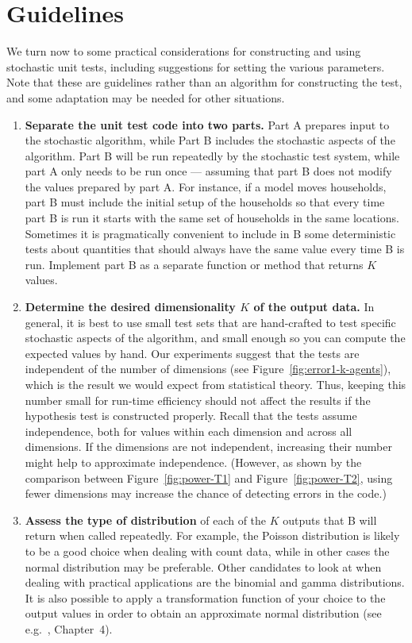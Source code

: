 \documentclass{sig-alternate-preprint}
\begin{document}
\section{Guidelines}
\label{sec:guidelines}

We turn now to some practical considerations for constructing and using
stochastic unit tests, including suggestions for setting the various
parameters.  Note that these are guidelines rather than an
algorithm for constructing the test, and some adaptation may be needed for
other situations.

\begin{enumerate}

\item
{\bf Separate the unit test code into two parts.}  Part A prepares input to the
stochastic algorithm, while Part B includes the stochastic aspects of the
algorithm.  Part B will be run repeatedly by the stochastic test system,
while part A only needs to be run once --- assuming that part B does not
modify the values prepared by part A\@.  For instance, if a model moves
households, part B must include the initial setup of the households so that
every time part B is run it starts with the same set of households in the
same locations.  Sometimes it is pragmatically convenient to include in B
some deterministic tests about quantities that should always have the same
value every time B is run.  Implement part B as a separate function or
method that returns $K$ values.

\item
{\bf Determine the desired dimensionality $K$ of the output data.}  In
general, it is best to use small test sets that are hand-crafted to test
specific stochastic aspects of the algorithm, and small enough so you can
compute the expected values by hand.  Our experiments suggest that the
tests are independent of the number of dimensions (see
Figure~\ref{fig:error1-k-agents}), which is the result we would expect from
statistical theory.  Thus, keeping this number small for run-time
efficiency should not affect the results if the hypothesis test is
constructed properly.  Recall that the tests assume independence, both for
values within each dimension and across all dimensions.  If the dimensions
are not independent, increasing their number might help to approximate
independence.  (However, as shown by the comparison between
Figure~\ref{fig:power-T1} and Figure~\ref{fig:power-T2}, using fewer
dimensions may increase the chance of detecting errors in the code.)

\item
\label{assess-type-of-distribution}
{\bf Assess the type of distribution} of each of the $K$ outputs that B will
return when called repeatedly.  For example, the Poisson distribution is
likely to be a good choice when dealing with count data, while in other cases
the normal distribution may be preferable.  Other candidates to look at when
dealing with practical applications are the binomial and gamma
distributions.  It is also possible to apply a transformation function of your
choice to the output values in order to obtain an approximate normal
distribution (see e.g.~\cite{Afifi&2004}, Chapter~4).




\end{enumerate}
\end{document}
